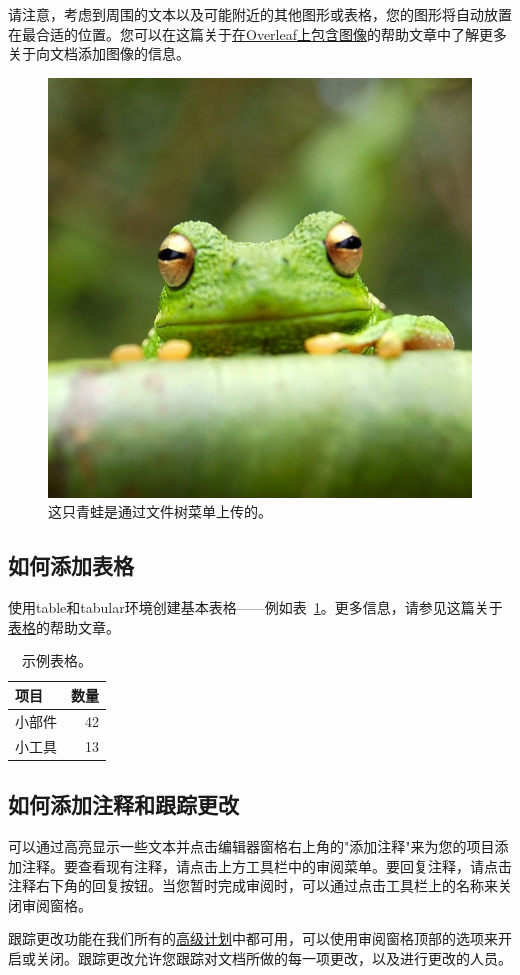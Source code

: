 \documentclass{article}
\begin{document}
请注意，考虑到周围的文本以及可能附近的其他图形或表格，您的图形将自动放置在最合适的位置。您可以在这篇关于\href{https://www.overleaf.com/learn/how-to/Including_images_on_Overleaf}{在Overleaf上包含图像}的帮助文章中了解更多关于向文档添加图像的信息。

\begin{figure}[H]
      \centering
      \includegraphics[width=0.25\linewidth]{frog.jpg}
      \caption{\label{fig:frog}这只青蛙是通过文件树菜单上传的。}
\end{figure}

\subsection{如何添加表格}

使用table和tabular环境创建基本表格——例如表~\ref{tab:widgets}。更多信息，请参见这篇关于\href{https://www.overleaf.com/learn/latex/tables}{表格}的帮助文章。

\begin{table}[H]
      \centering
      \begin{tabular}{l|r}
            项目  & 数量 \\\hline
            小部件 & 42 \\
            小工具 & 13
      \end{tabular}
      \caption{\label{tab:widgets}示例表格。}
\end{table}

\subsection{如何添加注释和跟踪更改}

可以通过高亮显示一些文本并点击编辑器窗格右上角的"添加注释"来为您的项目添加注释。要查看现有注释，请点击上方工具栏中的审阅菜单。要回复注释，请点击注释右下角的回复按钮。当您暂时完成审阅时，可以通过点击工具栏上的名称来关闭审阅窗格。

跟踪更改功能在我们所有的\href{https://www.overleaf.com/user/subscription/plans}{高级计划}中都可用，可以使用审阅窗格顶部的选项来开启或关闭。跟踪更改允许您跟踪对文档所做的每一项更改，以及进行更改的人员。
\end{document}

